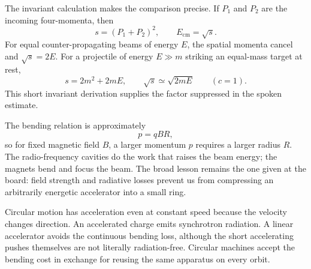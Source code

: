 The invariant calculation makes the comparison precise. If \(P_1\) and
\(P_2\) are the incoming four-momenta, then
\begin{equation}
s=(P_1+P_2)^2,
\qquad E_{\mathrm{cm}}=\sqrt{s}.
\end{equation}
For equal counter-propagating beams of energy \(E\), the spatial momenta
cancel and \(\sqrt{s}=2E\). For a projectile of energy \(E\gg m\) striking an
equal-mass target at rest,
\begin{equation}
s=2m^2+2mE,
\qquad
\sqrt{s}\simeq \sqrt{2mE}
\qquad (c=1).
\end{equation}
This short invariant derivation supplies the factor suppressed in the spoken
estimate.

\begin{classroomqa}
\end{classroomqa}

The bending relation is approximately
\begin{equation}
p=qBR,
\end{equation}
so for fixed magnetic field \(B\), a larger momentum \(p\) requires a larger
radius \(R\). The radio-frequency cavities do the work that raises the beam
energy; the magnets bend and focus the beam. The broad lesson remains the one
given at the board: field strength and radiative losses prevent us from
compressing an arbitrarily energetic accelerator into a small ring.

Circular motion has acceleration even at constant speed because the velocity
changes direction. An accelerated charge emits synchrotron radiation. A
linear accelerator avoids the continuous bending loss, although the short
accelerating pushes themselves are not literally radiation-free. Circular
machines accept the bending cost in exchange for reusing the same apparatus on
every orbit.

\begin{classroomqa}
\end{classroomqa}


